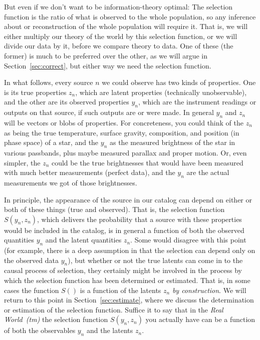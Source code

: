 \documentclass[modern]{aastex62}
\newcommand{\sectionname}{Section}
\begin{document}
But even if we don't want to be information-theory optimal: The
selection function is the ratio of what is observed to the whole
population, so any inference about or reconstruction of the whole
population will require it.
That is, we will either multiply our theory of the world by this
selection function, or we will divide our data by it, before we
compare theory to data.
One of these (the former) is much to be preferred over the other, as
we will argue in \sectionname~\ref{sec:correct}, but either way we
need the selection function.

In what follows, every source $n$ we could observe has two kinds of
properties.
One is its true properties $z_n$, which are latent
properties (technically unobservable), and the other are its observed
properties $y_n$, which are the instrument readings or outputs on that
source, if such outputs are or were made.
In general $y_n$ and $z_n$ will be vectors or blobs of properties.
For concreteness, you could think of the $z_n$ as being the true
temperature, surface gravity, composition, and position (in phase
space) of a star, and the $y_n$ as the measured brightness of the star
in various passbands, plus maybe measured parallax and proper motion.
Or, even simpler, the $z_n$ could be the true brightnesses that would
have been measured with much better measurements (perfect data), and
the $y_n$ are the actual measurements we got of those brightnesses.

In principle, the appearance of the source in our catalog can depend
on either or both of these things (true and observed).
That is, the selection function $S(y_n, z_n)$, which delivers the
probability that a source with these properties would be included in
the catalog, is in general a function of both the observed quantities
$y_n$ and the latent quantities $z_n$.
Some would disagree with this point (for example, there is a deep
assumption in \citealt{loredo} that the selection can depend only on
the observed data $y_n$), but whether or not the true latents can come
in to the causal process of selection, they certainly might be involved
in the process by which the selection function has been determined or
estimated.
That is, in some cases the function $S()$ is a function of the latents $z_n$
\emph{by construction}.
We will return to this point in \sectionname~\ref{sec:estimate},
where we discuss the determination or estimation of the selection
function.
Suffice it to say that in the \textsl{Real World~(tm)} the selection
function $S(y_n, z_n)$ you actually have can be a function of both the
observables $y_n$ and the latents $z_n$.
\end{document}
